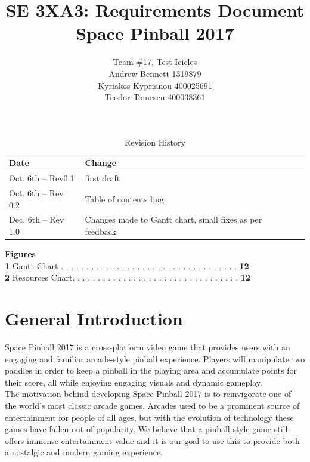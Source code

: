\documentclass[12pt]{article}
\title{SE 3XA3: Requirements Document\\Space Pinball 2017}
\author{Team \#17, Test Icicles
		\\ Andrew Bennett 1319879
		\\ Kyriakos Kyprianou 400025691
		\\ Teodor Tomescu 400038361
}
\date{}
\begin{document}
\begin{table}[hp]
\caption{Revision History} \label{TblRevisionHistory}
\begin{tabularx}{\textwidth}{llX}
\toprule
\textbf{Date} &  \textbf{Change}\\
\midrule
Oct. 6th -- Rev0.1 	 & first draft \\

Oct. 6th -- Rev 0.2 & Table of contents bug\\
Dec. 6th -- Rev 1.0 & Changes made to Gantt chart, small fixes as per feedback \\
\bottomrule
\end{tabularx}
\end{table}

\newpage


\maketitle

\clearpage

\tableofcontents

\newpage

\textbf{{\Large Figures}}\\

\textbf{1} Gantt Chart . . . . . . . . . . . . . . . . . . . . . . . . . . . . . . . . . . . \textbf{12}\\
\textbf{2} Resources Chart. . . . . . . . . . . . . . . . . . . . . . . . . . . . . . . . . \textbf{12}

\clearpage

\newpage


\section{General Introduction}

Space Pinball 2017 is a cross-platform video game that provides users with an engaging and familiar arcade-style pinball experience. Players will manipulate two paddles in order to keep a pinball in the playing area and accumulate points for their score, all while enjoying engaging visuals and dynamic gameplay.\\

The motivation behind developing Space Pinball 2017 is to reinvigorate one of the world's most classic arcade games. Arcades used to be a prominent source of entertainment for people of all ages, but with the evolution of technology these games have fallen out of popularity. We believe that a pinball style game still offers immense entertainment value and it is our goal to use this to provide both a nostalgic and modern gaming experience.\\
\end{document}
